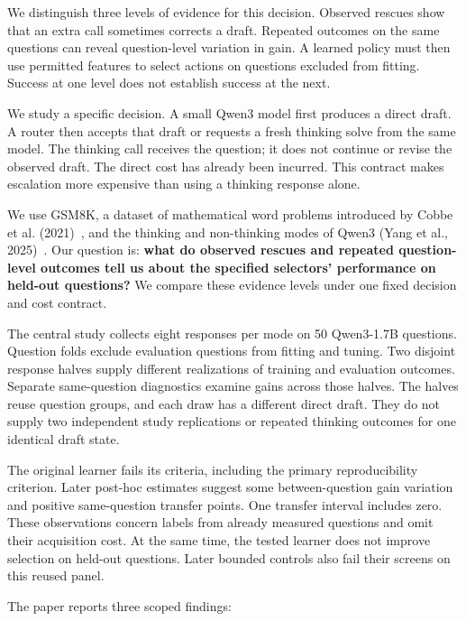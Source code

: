 \documentclass[11pt,a4paper]{article}
\begin{document}
We distinguish three levels of evidence for this decision. Observed rescues show that an extra call sometimes corrects a draft. Repeated outcomes on the same questions can reveal question-level variation in gain. A learned policy must then use permitted features to select actions on questions excluded from fitting. Success at one level does not establish success at the next.

We study a specific decision. A small Qwen3 model first produces a direct draft. A router then accepts that draft or requests a fresh thinking solve from the same model. The thinking call receives the question; it does not continue or revise the observed draft. The direct cost has already been incurred. This contract makes escalation more expensive than using a thinking response alone.

We use GSM8K, a dataset of mathematical word problems introduced by Cobbe et al. (2021)~\citep{cobbe2021gsm8k}, and the thinking and non-thinking modes of Qwen3 (Yang et al., 2025)~\citep{qwen2025qwen3}. Our question is: \textbf{what do observed rescues and repeated question-level outcomes tell us about the specified selectors' performance on held-out questions?} We compare these evidence levels under one fixed decision and cost contract.

The central study collects eight responses per mode on 50 Qwen3-1.7B questions. Question folds exclude evaluation questions from fitting and tuning. Two disjoint response halves supply different realizations of training and evaluation outcomes. Separate same-question diagnostics examine gains across those halves. The halves reuse question groups, and each draw has a different direct draft. They do not supply two independent study replications or repeated thinking outcomes for one identical draft state.

The original learner fails its criteria, including the primary reproducibility criterion. Later post-hoc estimates suggest some between-question gain variation and positive same-question transfer points. One transfer interval includes zero. These observations concern labels from already measured questions and omit their acquisition cost. At the same time, the tested learner does not improve selection on held-out questions. Later bounded controls also fail their screens on this reused panel.

The paper reports three scoped findings:
\end{document}
